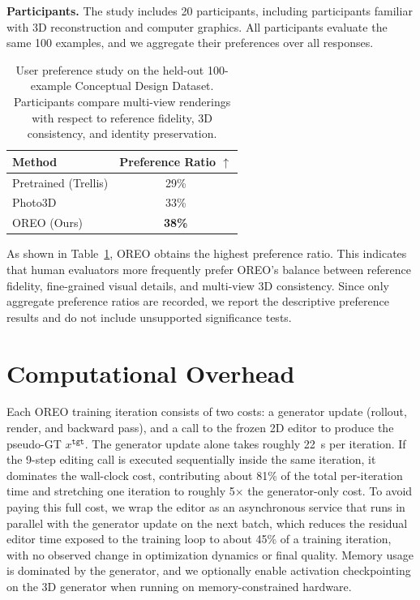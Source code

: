 \documentclass[runningheads]{llncs}
\begin{document}
\textbf{Participants.}
The study includes 20 participants, including participants familiar with 3D reconstruction and computer graphics.
All participants evaluate the same 100 examples, and we aggregate their preferences over all responses.

\begin{table}[t]
  \centering
  \caption{User preference study on the held-out 100-example Conceptual Design Dataset. Participants compare multi-view renderings with respect to reference fidelity, 3D consistency, and identity preservation.}
  \label{tab:user_preference}
  \begin{tabular}{@{}lc@{}}
    \toprule
    Method & Preference Ratio $\uparrow$ \\
    \midrule
    Pretrained (Trellis) & 29\% \\
    Photo3D & 33\% \\
    OREO (Ours) & \textbf{38\%} \\
    \bottomrule
  \end{tabular}
\end{table}

As shown in Table~\ref{tab:user_preference}, OREO obtains the highest preference ratio.
This indicates that human evaluators more frequently prefer OREO's balance between reference fidelity, fine-grained visual details, and multi-view 3D consistency.
Since only aggregate preference ratios are recorded, we report the descriptive preference results and do not include unsupported significance tests.

\section{Computational Overhead}
\label{sec:computational_overhead}
Each OREO training iteration consists of two costs: a generator update (rollout, render, and backward pass), and a call to the frozen 2D editor to produce the pseudo-GT $x^{\texttt{tgt}}$.
The generator update alone takes roughly 22~s per iteration.
If the 9-step editing call is executed sequentially inside the same iteration, it dominates the wall-clock cost, contributing about 81\% of the total per-iteration time and stretching one iteration to roughly 5$\times$ the generator-only cost.
To avoid paying this full cost, we wrap the editor as an asynchronous service that runs in parallel with the generator update on the next batch, which reduces the residual editor time exposed to the training loop to about 45\% of a training iteration, with no observed change in optimization dynamics or final quality.
Memory usage is dominated by the generator, and we optionally enable activation checkpointing on the 3D generator when running on memory-constrained hardware.
\end{document}
